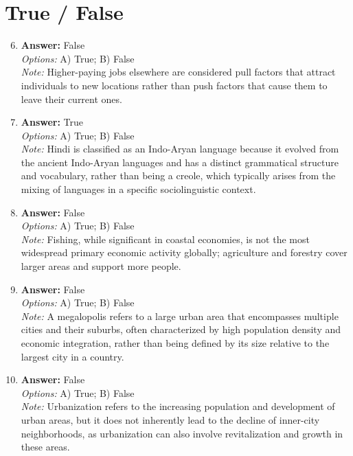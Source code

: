 \documentclass[12pt]{article}
\begin{document}
\section*{True / False}
\begin{enumerate}[label=\arabic*.]
\setcounter{enumi}{5}
\item \textbf{Answer:} False
\\ \textit{Options:} A) True; B) False
\\ \textit{Note:} Higher-paying jobs elsewhere are considered pull factors that attract individuals to new locations rather than push factors that cause them to leave their current ones.
\item \textbf{Answer:} True
\\ \textit{Options:} A) True; B) False
\\ \textit{Note:} Hindi is classified as an Indo-Aryan language because it evolved from the ancient Indo-Aryan languages and has a distinct grammatical structure and vocabulary, rather than being a creole, which typically arises from the mixing of languages in a specific sociolinguistic context.
\item \textbf{Answer:} False
\\ \textit{Options:} A) True; B) False
\\ \textit{Note:} Fishing, while significant in coastal economies, is not the most widespread primary economic activity globally; agriculture and forestry cover larger areas and support more people.
\item \textbf{Answer:} False
\\ \textit{Options:} A) True; B) False
\\ \textit{Note:} A megalopolis refers to a large urban area that encompasses multiple cities and their suburbs, often characterized by high population density and economic integration, rather than being defined by its size relative to the largest city in a country.
\item \textbf{Answer:} False
\\ \textit{Options:} A) True; B) False
\\ \textit{Note:} Urbanization refers to the increasing population and development of urban areas, but it does not inherently lead to the decline of inner-city neighborhoods, as urbanization can also involve revitalization and growth in these areas.
\end{enumerate}
\end{document}
